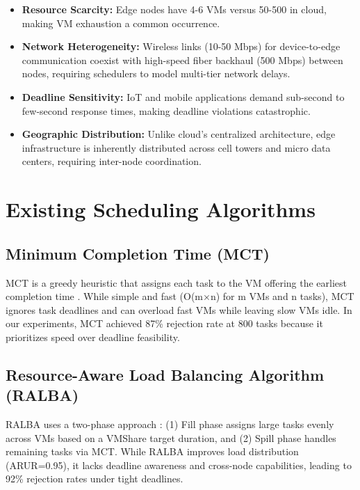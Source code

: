 \documentclass[12pt]{report}
\begin{document}
\begin{itemize}
    \item \textbf{Resource Scarcity:} Edge nodes have 4-6 VMs versus 50-500 in cloud, making VM exhaustion a common occurrence.
    
    \item \textbf{Network Heterogeneity:} Wireless links (10-50 Mbps) for device-to-edge communication coexist with high-speed fiber backhaul (500 Mbps) between nodes, requiring schedulers to model multi-tier network delays.
    
    \item \textbf{Deadline Sensitivity:} IoT and mobile applications demand sub-second to few-second response times, making deadline violations catastrophic.
    
    \item \textbf{Geographic Distribution:} Unlike cloud's centralized architecture, edge infrastructure is inherently distributed across cell towers and micro data centers, requiring inter-node coordination.
\end{itemize}

\section{Existing Scheduling Algorithms}

\subsection{Minimum Completion Time (MCT)}

MCT is a greedy heuristic that assigns each task to the VM offering the earliest completion time \cite{mct_braun_2001}. While simple and fast (O(m×n) for m VMs and n tasks), MCT ignores task deadlines and can overload fast VMs while leaving slow VMs idle. In our experiments, MCT achieved 87\% rejection rate at 800 tasks because it prioritizes speed over deadline feasibility.

\subsection{Resource-Aware Load Balancing Algorithm (RALBA)}

RALBA uses a two-phase approach \cite{ralba_2018}: (1) Fill phase assigns large tasks evenly across VMs based on a VMShare target duration, and (2) Spill phase handles remaining tasks via MCT. While RALBA improves load distribution (ARUR=0.95), it lacks deadline awareness and cross-node capabilities, leading to 92\% rejection rates under tight deadlines.
\end{document}

